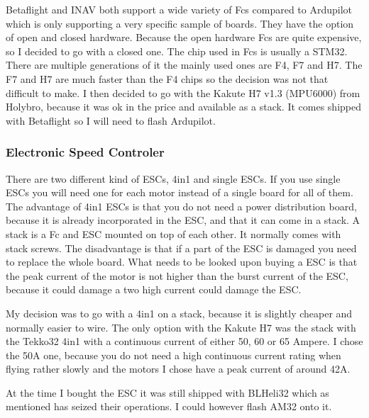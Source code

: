 \documentclass{article}
\begin{document}
	Betaflight and INAV both support a wide variety of \gls{Fc}s compared to Ardupilot which is only supporting a very specific sample of boards\cite{FcSupport}. They have the option of open and closed hardware. Because the open hardware \gls{Fc}s are quite expensive, so I decided to go with a closed one. The chip used in \gls{Fc}s is usually a STM32. There are multiple generations of it the mainly used ones are F4, F7 and H7. The F7 and H7 are much faster than the F4 chips so the decision was not that difficult to make. I then decided to go with the Kakute H7 v1.3 (MPU6000)\cite{KakuteH7} from Holybro, because it was ok in the price and available as a stack. It comes shipped with Betaflight so I will need to flash Ardupilot. 



	\subsubsection[ESC]{Electronic Speed Controler}
	There are two different kind of ESCs, 4in1 and single ESCs. If you use single ESCs you will need one for each motor instead of a single board for all of them. The advantage of 4in1 ESCs is that you do not need a power distribution board, because it is already incorporated in the ESC, and that it can come in a stack. A stack is a Fc and ESC mounted on top of each other. It normally comes with stack screws. The disadvantage is that if a part of the ESC is damaged you need to replace the whole board. What needs to be looked upon buying a ESC is that the peak current of the motor is not higher than the burst current of the ESC, because it could damage a two high current could damage the ESC.
	
	My decision was to go with a 4in1 on a stack, because it is slightly cheaper and normally easier to wire. The only option with the Kakute H7 was the stack with the Tekko32 4in1 with a continuous current of either 50, 60 or 65 Ampere. I chose the 50A\cite{Tekko32} one, because you do not need a high continuous current rating when flying rather slowly and the motors I chose have a peak current of around 42A. 
	
	At the time I bought the ESC it was still shipped with BLHeli32 which as mentioned has seized their operations. I could however flash AM32 onto it.
\end{document}
